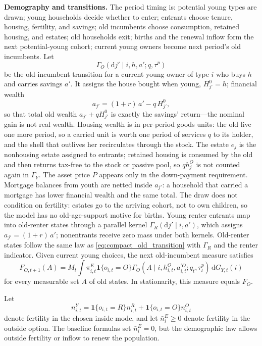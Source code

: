 \documentclass[11pt]{article}
\newcommand{\dd}{\mathrm d}
\newcommand{\1}{\mathbf 1}
\begin{document}
\textbf{Demography and transitions.} The period timing is: potential young types are drawn; young households decide whether to enter; entrants choose tenure, housing, fertility, and savings; old incumbents choose consumption, retained housing, and estates; old households exit; births and the renewal inflow form the next potential-young cohort; current young owners become next period's old incumbents. Let
\[
\Gamma_O(\dd j'\mid i,h,a';q,\tau^p)
\]
be the old-incumbent transition for a current young owner of type $i$ who buys $h$ and carries savings $a'$. It assigns the house bought when young, $H_{j'}^0=h$; financial wealth
\[
a_{j'}=(1+r)\,a'-q\,H_{j'}^0,
\]
so that total old wealth $a_{j'}+qH_{j'}^0$ is exactly the savings' return---the nominal gain is not real wealth. Housing wealth is in per-period goods units: the old live one more period, so a carried unit is worth one period of services $q$ to its holder, and the shell that outlives her recirculates through the stock. The estate $e_j$ is the nonhousing estate assigned to entrants; retained housing is consumed by the old and then returns tax-free to the stock or passive pool, so $q h_j^O$ is not counted again in $\Gamma_Y$. The asset price $P$ appears only in the down-payment requirement. Mortgage balances from youth are netted inside $a_{j'}$: a household that carried a mortgage has lower financial wealth and the same total. The draw does not condition on fertility: estates go to the arriving cohort, not to own children, so the model has no old-age-support motive for births. Young renter entrants map into old-renter states through a parallel kernel $\Gamma_R(\dd j'\mid i,a')$, which assigns $a_{j'}=(1+r)\,a'$; nonentrants receive zero mass under both kernels. Old-renter states follow the same law as \eqref{eq:compact_old_transition} with $\Gamma_R$ and the renter indicator. Given current young choices, the next old-incumbent measure satisfies
\begin{equation}
F_{O,t+1}(A)
=
M_t\int
\pi_{i,t}^E\1\{o_{i,t}=O\}
\Gamma_O(A\mid i,h_{i,t}^O,a_{i,t}^{\prime O};q_t,\tau_t^p)\,
\dd G_{Y,t}(i)
\label{eq:compact_old_transition}
\end{equation}
for every measurable set $A$ of old states. In stationarity, this measure equals $F_O$.

Let
\begin{equation}
n_{i,t}^{Y}
=
\1\{o_{i,t}=R\}n_{i,t}^R+
\1\{o_{i,t}=O\}n_{i,t}^O
\label{eq:compact_inside_fertility}
\end{equation}
denote fertility in the chosen inside mode, and let $\bar n_i^E\ge0$ denote fertility in the outside option. The baseline formulas set $\bar n_i^E=0$, but the demographic law allows outside fertility or inflow to renew the population.
\end{document}
